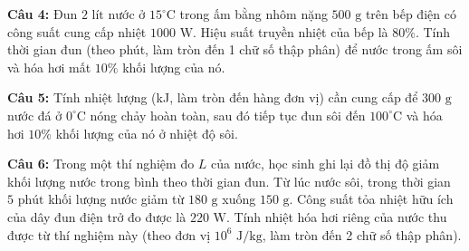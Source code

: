 \documentclass[12pt,a4paper]{article}
\begin{document}
\textbf{Câu 4:} Đun $2\text{ lít}$ nước ở $15^{\circ}\text{C}$ trong ấm bằng nhôm nặng $500\text{ g}$ trên bếp điện có công suất cung cấp nhiệt $1000\text{ W}$. Hiệu suất truyền nhiệt của bếp là $80\%$. Tính thời gian đun (theo phút, làm tròn đến 1 chữ số thập phân) để nước trong ấm sôi và hóa hơi mất $10\%$ khối lượng của nó.
\hrulefill

\textbf{Câu 5:} Tính nhiệt lượng (kJ, làm tròn đến hàng đơn vị) cần cung cấp để $300\text{ g}$ nước đá ở $0^{\circ}\text{C}$ nóng chảy hoàn toàn, sau đó tiếp tục đun sôi đến $100^{\circ}\text{C}$ và hóa hơi $10\%$ khối lượng của nó ở nhiệt độ sôi.
\hrulefill

\textbf{Câu 6:} Trong một thí nghiệm đo $L$ của nước, học sinh ghi lại đồ thị độ giảm khối lượng nước trong bình theo thời gian đun. Từ lúc nước sôi, trong thời gian $5\text{ phút}$ khối lượng nước giảm từ $180\text{ g}$ xuống $150\text{ g}$. Công suất tỏa nhiệt hữu ích của dây đun điện trở đo được là $220\text{ W}$. Tính nhiệt hóa hơi riêng của nước thu được từ thí nghiệm này (theo đơn vị $10^6\text{ J/kg}$, làm tròn đến 2 chữ số thập phân).
\hrulefill
\end{document}
